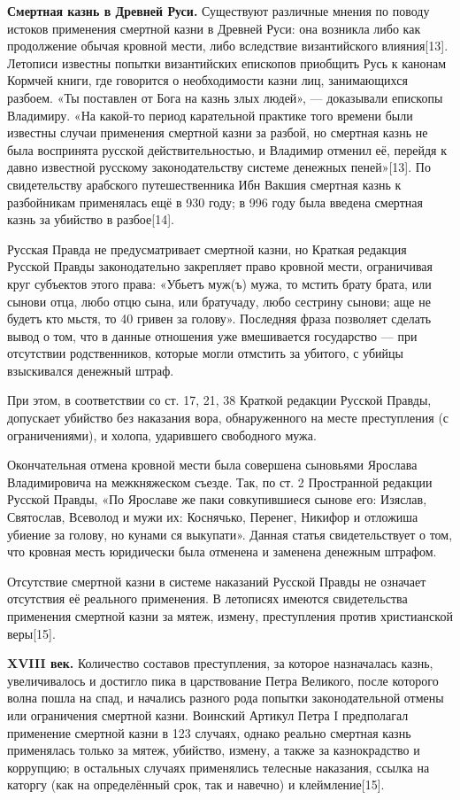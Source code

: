 \textbf{Смертная казнь в Древней Руси.} Существуют различные мнения по поводу истоков применения смертной казни в Древней Руси: она возникла либо как продолжение обычая кровной мести, либо вследствие византийского влияния[13]. Летописи известны попытки византийских епископов приобщить Русь к канонам Кормчей книги, где говорится о необходимости казни лиц, занимающихся разбоем. «Ты поставлен от Бога на казнь злых людей», — доказывали епископы Владимиру. «На какой-то период карательной практике того времени были известны случаи применения смертной казни за разбой, но смертная казнь не была воспринята русской действительностью, и Владимир отменил её, перейдя к давно известной русскому законодательству системе денежных пеней»[13]. По свидетельству арабского путешественника Ибн Вакшия смертная казнь к разбойникам применялась ещё в 930 году; в 996 году была введена смертная казнь за убийство в разбое[14].

Русская Правда не предусматривает смертной казни, но Краткая редакция Русской Правды законодательно закрепляет право кровной мести, ограничивая круг субъектов этого права: «Убьетъ муж(ъ) мужа, то мстить брату брата, или сынови отца, любо отцю сына, или братучаду, любо сестрину сынови; аще не будетъ кто мьстя, то 40 гривен за голову». Последняя фраза позволяет сделать вывод о том, что в данные отношения уже вмешивается государство — при отсутствии родственников, которые могли отмстить за убитого, с убийцы взыскивался денежный штраф.

При этом, в соответствии со ст. 17, 21, 38 Краткой редакции Русской Правды, допускает убийство без наказания вора, обнаруженного на месте преступления (с ограничениями), и холопа, ударившего свободного мужа.

Окончательная отмена кровной мести была совершена сыновьями Ярослава Владимировича на межкняжеском съезде. Так, по ст. 2 Пространной редакции Русской Правды, «По Ярославе же паки совкупившиеся сынове его: Изяслав, Святослав, Всеволод и мужи их: Коснячько, Перенег, Никифор и отложиша убиение за голову, но кунами ся выкупати». Данная статья свидетельствует о том, что кровная месть юридически была отменена и заменена денежным штрафом.

Отсутствие смертной казни в системе наказаний Русской Правды не означает отсутствия её реального применения. В летописях имеются свидетельства применения смертной казни за мятеж, измену, преступления против христианской веры[15].

\textbf{XVIII век.} Количество составов преступления, за которое назначалась казнь, увеличивалось и достигло пика в царствование Петра Великого, после которого волна пошла на спад, и начались разного рода попытки законодательной отмены или ограничения смертной казни. Воинский Артикул Петра I предполагал применение смертной казни в 123 случаях, однако реально смертная казнь применялась только за мятеж, убийство, измену, а также за казнокрадство и коррупцию; в остальных случаях применялись телесные наказания, ссылка на каторгу (как на определённый срок, так и навечно) и клеймление[15].

